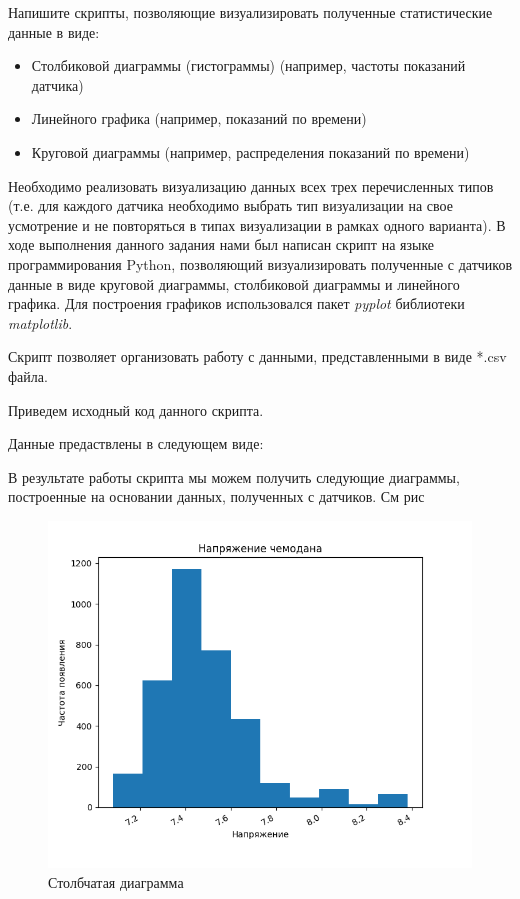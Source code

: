 \documentclass[a4paper,14pt]{extarticle}
\newcommand{\pathToScriptsFolder}{/home/denilai/Documents/repos/latex/scripts}
\begin{document}
\begin{problem}
	Напишите скрипты, позволяющие визуализировать полученные статистические данные в виде:
	
	\begin{itemize}
		\item Столбиковой диаграммы (гистограммы) (например, частоты показаний датчика)
		\item Линейного графика (например, показаний по времени)
		\item Круговой диаграммы (например, распределения показаний по времени)
	\end{itemize}
	
	Необходимо реализовать визуализацию данных всех трех перечисленных типов (т.е. для каждого датчика необходимо выбрать тип визуализации на свое усмотрение и не повторяться в типах визуализации в рамках одного варианта).
	\nonum В ходе выполнения данного задания нами был написан скрипт на языке программирования Python, позволяющий визуализировать полученные с датчиков данные в виде круговой диаграммы, столбиковой диаграммы и линейного графика. Для построения графиков использовался пакет \textit{pyplot} библиотеки \textit{matplotlib}.
	
	Скрипт позволяет организовать работу с данными, представленными в виде *.csv файла.
	
	 Приведем исходный код данного скрипта.
	
	
	
	
	Данные предаствлены в следующем виде:
	
	
	В результате работы скрипта мы можем получить следующие диаграммы, построенные на основании данных, полученных с датчиков. См рис
	
	\begin{figure}[h!]
		\centering
		\includegraphics[width=0.6\linewidth]{images/main8-voltage}
		\caption{Столбчатая диаграмма }
		\label{fig:main8-voltage}
	\end{figure}


\end{problem}
\end{document}
